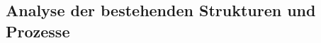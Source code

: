 \subsection{Analyse der bestehenden Strukturen und Prozesse}
\label{subsec:analyse-der-bestehenden-strukturen-und-prozesse}